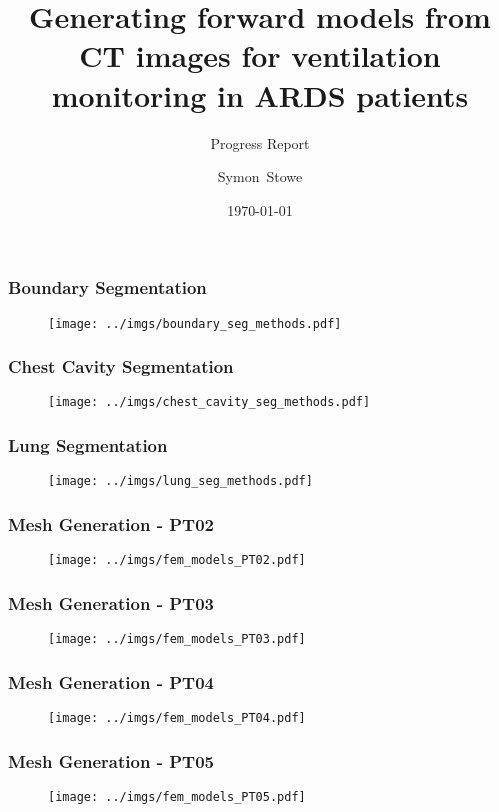 \documentclass[10pt,    %
    english,            %
    xcolor=table,       %
    envcountsect,        %
    aspectratio=1610
]{beamer}
\title[] %
{Generating forward models from CT images for ventilation
monitoring in ARDS patients}
\subtitle{Progress Report}
\date[] %
    {\today}
\author[] %
{\alert{Symon~Stowe}}
\institute[] %
{\texttt{symonstowe@sce.carleton.ca}
}
\begin{document}
	
\begin{frame}
  \titlepage
\end{frame}

 \begin{frame}
 	\frametitle{Boundary Segmentation}    
		\begin{figure}[H]
			\centering
			\texttt{[image: ../imgs/boundary\_seg\_methods.pdf]}
		\end{figure}
 \end{frame}

 \begin{frame}
 	\frametitle{Chest Cavity Segmentation}    
		\begin{figure}[H]
			\centering
			\texttt{[image: ../imgs/chest\_cavity\_seg\_methods.pdf]}
		\end{figure}
 \end{frame}

 \begin{frame}
 	\frametitle{Lung Segmentation}    
		\begin{figure}[H]
			\centering
			\texttt{[image: ../imgs/lung\_seg\_methods.pdf]}
		\end{figure}
 \end{frame}
 
\begin{frame}
 	\frametitle{Mesh Generation - PT02}    
		\begin{figure}[H]
			\centering
			\texttt{[image: ../imgs/fem\_models\_PT02.pdf]}
		\end{figure}
 \end{frame}

\begin{frame}
 	\frametitle{Mesh Generation - PT03}    
		\begin{figure}[H]
			\centering
			\texttt{[image: ../imgs/fem\_models\_PT03.pdf]}
		\end{figure}
 \end{frame}

\begin{frame}
 	\frametitle{Mesh Generation - PT04}    
		\begin{figure}[H]
			\centering
			\texttt{[image: ../imgs/fem\_models\_PT04.pdf]}
		\end{figure}
 \end{frame}

\begin{frame}
 	\frametitle{Mesh Generation - PT05}    
		\begin{figure}[H]
			\centering
			\texttt{[image: ../imgs/fem\_models\_PT05.pdf]}
		\end{figure}
 \end{frame}
\end{document}
